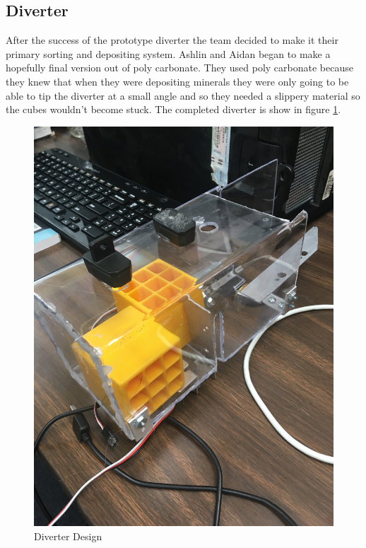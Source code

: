 \documentclass{article}
\begin{document}
\subsection{Diverter}
After the success of the prototype diverter the team decided to make it their primary sorting and depositing system. Ashlin and Aidan began to make a hopefully final version out of poly carbonate. They used poly carbonate because they knew that when they were depositing minerals they were only going to be able to tip the diverter at a small angle and so they needed a slippery material so the cubes wouldn't become stuck. The completed diverter is show in figure  \ref{fig:diverter}.

\begin{figure}
    \centering
    \includegraphics[width=.6 \textwidth]{15_12-10/images/Diverter.jpg}
    \caption{Diverter Design}
    \label{fig:diverter}
\end{figure}
\end{document}
